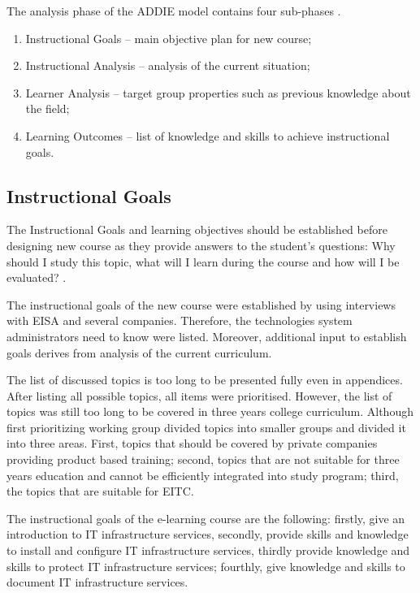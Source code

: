 The analysis phase of the \gls{ADDIE} model contains four sub-phases \citep{website:addie}.
\begin{enumerate}
\item Instructional Goals -- main objective plan for new course;
\item Instructional Analysis -- analysis of the current situation;
\item Learner Analysis -- target group properties such as previous knowledge about the field;
\item Learning Outcomes -- list of knowledge and skills to achieve instructional goals.
\end{enumerate}


\subsection{Instructional Goals}
The Instructional Goals and learning objectives should be established before designing new course as they provide answers to the student’s questions: Why should I study this topic, what will I learn during the course and how will I be evaluated? \citep{website:addie}.


The instructional goals of the new course were established by using interviews with \gls{EISA} and several companies. Therefore, the technologies system administrators need to know were listed.  Moreover, additional input to establish goals derives from analysis of the current curriculum.

The list of discussed topics is too  long to be presented fully even in appendices. After listing all possible topics, all items were prioritised. However, the list of topics was still too long to  be covered in three years college curriculum. Although first prioritizing working group divided topics into smaller groups and divided it into three areas. First, topics that should be covered by private companies providing product based training; second, topics that are not suitable for three years education and cannot be efficiently integrated into study program; third, the topics that are suitable for \gls{EITC}.

The instructional goals of the e-learning course are the following: firstly, give an introduction to IT infrastructure services, secondly, provide skills and knowledge to install and configure IT infrastructure services, thirdly provide knowledge and skills to protect IT infrastructure services; fourthly, give knowledge and skills to document IT infrastructure services.

